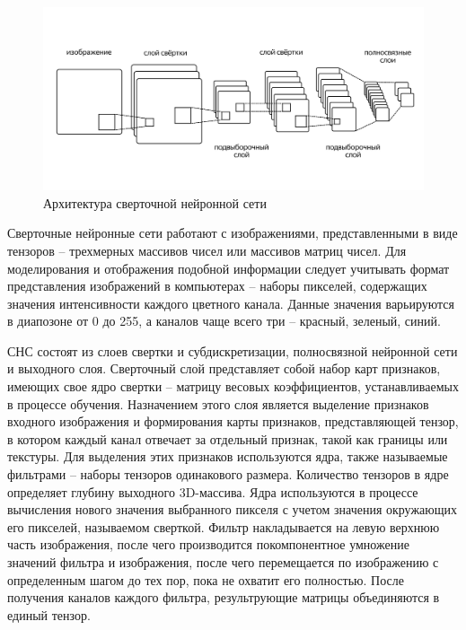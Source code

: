 \begin{figure}[h]
	\centering
	\includegraphics[width=0.7\linewidth]{images/CNN}
	\caption{Архитектура сверточной нейронной сети}
	\label{fig:cnn}
\end{figure}

Сверточные нейронные сети работают с изображениями, представленными в виде тензоров -- трехмерных массивов чисел или массивов матриц чисел. Для моделирования и отображения подобной информации следует учитывать формат представления изображений в компьютерах -- наборы пикселей, содержащих значения интенсивности каждого цветного канала. Данные значения варьируются в диапозоне от 0 до 255, а каналов чаще всего три -- красный, зеленый, синий.

СНС состоят из слоев свертки и субдискретизации, полносвязной нейронной сети и выходного слоя. Сверточный слой представляет собой набор карт признаков, имеющих свое ядро свертки -- матрицу весовых коэффициентов, устанавливаемых в процессе обучения. Назначением этого слоя является выделение признаков входного изображения и формирования карты признаков, представляющей тензор, в котором каждый канал отвечает за отдельный признак, такой как границы или текстуры. Для выделения этих признаков используются ядра, также называемые фильтрами -- наборы тензоров одинакового размера. Количество тензоров в ядре определяет глубину выходного 3D-массива. Ядра используются в процессе вычисления нового значения выбранного пикселя с учетом значения окружающих его пикселей, называемом сверткой. Фильтр накладывается на левую верхнюю часть изображения, после чего производится покомпонентное умножение значений фильтра и изображения, после чего перемещается по изображению с определенным шагом до тех пор, пока не охватит его полностью\cite{godunov_cnn}. После получения каналов каждого фильтра, результрующие матрицы объединяются в единый тензор.

